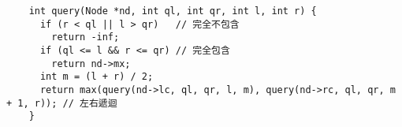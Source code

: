 \documentclass[standalone]{beamer}
\begin{document}
\begin{frame}[fragile]{}
  \begin{verbatim}
    int query(Node *nd, int ql, int qr, int l, int r) {
      if (r < ql || l > qr)   // 完全不包含
        return -inf;
      if (ql <= l && r <= qr) // 完全包含
        return nd->mx;
      int m = (l + r) / 2;
      return max(query(nd->lc, ql, qr, l, m), query(nd->rc, ql, qr, m + 1, r)); // 左右遞迴
    }
  \end{verbatim}
\end{frame}
\end{document}
